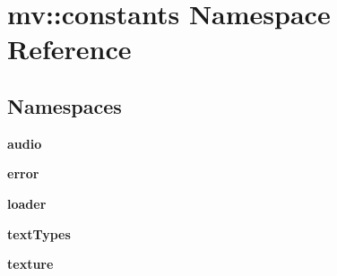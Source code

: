\section{mv\+:\+:constants Namespace Reference}
\label{namespacemv_1_1constants}
\subsection*{Namespaces}
\begin{DoxyCompactItemize}
\item 
 \textbf{ audio}
\item 
 \textbf{ error}
\item 
 \textbf{ loader}
\item 
 \textbf{ text\+Types}
\item 
 \textbf{ texture}
\end{DoxyCompactItemize}
